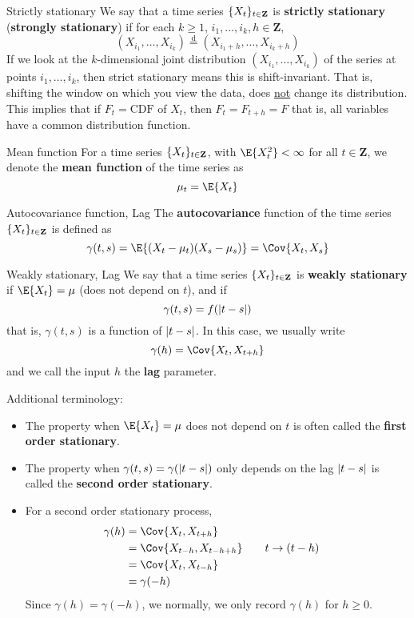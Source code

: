 \begin{Definition}{Strictly stationary}{}
    We say that a time series $ \{X_t\}_{t\in\mathbf{Z}} $
    is \textbf{strictly stationary} (\textbf{strongly stationary})
    if for each $ k\ge 1 $, $ i_1,\ldots,i_k,h\in\mathbf{Z} $,
    \[ (X_{i_1},\ldots,X_{i_k})\stackrel{\text{d}}{=}
        (X_{i_{1}+h},\ldots,X_{i_k+h}) \]
    {\color{blue}If we look at the $ k $-dimensional joint distribution
    $ (X_{i_1},\ldots,X_{i_k}) $
    of the series at points $ i_1,\ldots,i_k $, then
    strict stationary means this is shift-invariant.}
    That is, shifting the window on which
    you view the data, does \underline{not} change its distribution.
    This implies that if $ F_t=\text{CDF} $ of $ X_t $, then
    $ F_t=F_{t+h}=F $
    that is, all variables have a common distribution function.
\end{Definition}
\begin{Definition}{Mean function}{}
    For a time series $ \{X_t\}_{t\in\mathbf{Z}} $, with
    $ \E{X_t^2}<\infty $ for all $ t\in\mathbf{Z} $,
    we denote the \textbf{mean function} of the time series as
    \[ \mu_t=\E{X_t} \]
\end{Definition}
\begin{Definition}{Autocovariance function, Lag}{}
    The \textbf{autocovariance} function of the time series $ \{X_t\}_{t\in\mathbf{Z}} $
    is defined as
    \[ \gamma(t,s)=\E{(X_t-\mu_t)(X_s-\mu_s)}=\Cov{X_t,X_s} \]
\end{Definition}
\begin{Definition}{Weakly stationary, Lag}{}
    We say that a time series $ \{X_t\}_{t\in\mathbf{Z}} $
    is \textbf{weakly stationary} if $ \E{X_t}=\mu $
    (does not depend on $ t $), and if
    \[ \gamma(t,s)=f(\lvert t-s\rvert) \]
    that is, $ \gamma(t,s) $ is a function of $ \lvert t-s\rvert $. In this case,
    we usually write
    \[ \gamma(h)=\Cov{X_t,X_{t+h}} \]
    and we call the input $ h $ the \textbf{lag} parameter.
\end{Definition}
Additional terminology:
\begin{itemize}
    \item The property when $ \E{X_t}=\mu $ does not depend
          on $ t $ is often called the \textbf{first order stationary}.
    \item The property when $ \gamma(t,s)=\gamma(\lvert t-s\rvert) $
          only depends on the lag $ \lvert t-s\rvert $ is called the
          \textbf{second order stationary}.
    \item For a second order stationary process,
          \begin{align*}
              \gamma(h)
               & =\Cov{X_t,X_{t+h}}                                      \\
               & =\Cov{X_{t-h},X_{t-h+h}} & \quad & t\rightarrow{} (t-h) \\
               & =\Cov{X_t,X_{t-h}}                                      \\
               & =\gamma(-h)
          \end{align*}
          Since $ \gamma(h)=\gamma(-h) $, we
          normally, we only record $ \gamma(h) $ for $ h\ge 0 $.
\end{itemize}
